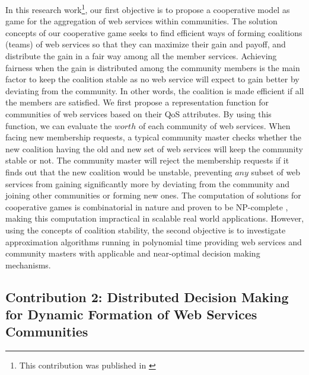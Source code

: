 In this research work\footnote{This contribution was published in \cite{10.1109/TSC.2014.2312940}}, our first objective is to propose a
cooperative model as game for the aggregation of web services
within communities. The solution concepts of our cooperative game
seeks to find efficient ways of forming coalitions (teams) of web
services so that they can maximize their gain and payoff, and
distribute the gain in a fair way among all the member services.
Achieving fairness when the gain is distributed among the
community members is the main factor to keep the coalition stable
as no web service will expect to gain better by deviating from the
community. In other words, the coalition is made efficient if all
the members are satisfied. We first propose a representation
function for communities of web services based on their QoS
attributes. By using this function, we can evaluate the $worth$ of
each community of web services. When facing new membership
requests, a typical community master checks whether the new
coalition having the old and new set of web services will keep the
community stable or not. The community master will reject the
membership requests if it finds out that the new coalition would
be unstable, preventing $any$ subset of web services from gaining
significantly more by deviating from the community and joining
other communities or forming new ones. The computation of
solutions for cooperative games is combinatorial in nature and
proven to be NP-complete \cite{Algorithmic}, making this
computation impractical in scalable real world applications. However, using
the concepts of coalition stability, the second objective is to
investigate approximation algorithms running in polynomial time
providing web services and community masters with applicable and
near-optimal decision making mechanisms.


\subsection{Contribution 2: Distributed Decision Making for Dynamic Formation of Web Services Communities}

